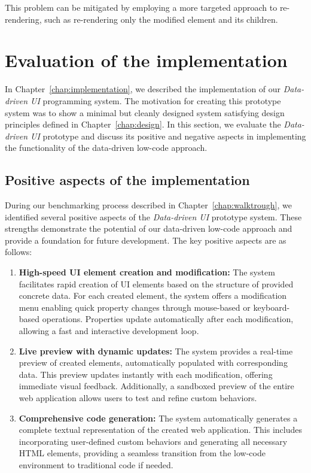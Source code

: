 \begin{enumerate}
	      This problem can be mitigated by employing a more targeted approach to re-rendering, such as re-rendering only the modified element and its children.

\end{enumerate}

\section{Evaluation of the implementation}

In Chapter~\ref{chap:implementation}, we described the implementation of our \emph{Data-driven UI} programming system.
The motivation for creating this prototype system was to show a minimal but cleanly designed system satisfying design principles defined in Chapter~\ref{chap:design}.
In this section, we evaluate the \emph{Data-driven UI} prototype and discuss its positive and negative aspects in implementing the functionality of the data-driven low-code approach.

\subsection{Positive aspects of the implementation}
During our benchmarking process described in Chapter~\ref{chap:walktrough},
we identified several positive aspects of the \emph{Data-driven UI} prototype system.
These strengths demonstrate the potential of our data-driven low-code approach and provide a foundation for future development.
The key positive aspects are as follows:
\begin{enumerate}
	\item \textbf{High-speed UI element creation and modification:}
	      The system facilitates rapid creation of UI elements based on the structure of provided concrete data.
	      For each created element, the system offers a modification menu enabling quick property changes through mouse-based or keyboard-based operations.
	      Properties update automatically after each modification, allowing a fast and interactive development loop.
	\item \textbf{Live preview with dynamic updates:}
	      The system provides a real-time preview of created elements, automatically populated with corresponding data.
	      This preview updates instantly with each modification, offering immediate visual feedback.
	      Additionally, a sandboxed preview of the entire web application allows users to test and refine custom behaviors.
	\item \textbf{Comprehensive code generation:}
	      The system automatically generates a complete textual representation of the created web application.
	      This includes incorporating user-defined custom behaviors and generating all necessary HTML elements,
	      providing a seamless transition from the low-code environment to traditional code if needed.
\end{enumerate}



